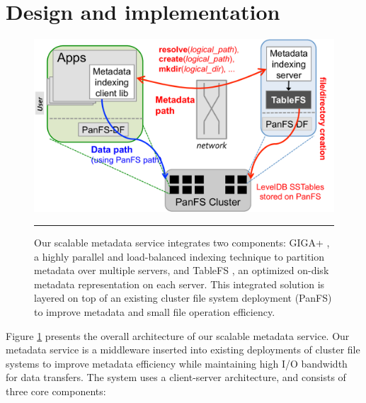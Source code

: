 \section{Design and implementation}

\begin{figure}[t]   %
\centerline{\includegraphics[scale=0.4]{./figs/giga-impl-leveldb-clusterfs}}
\vspace{10pt}
\caption{\textsf{\footnotesize
Our scalable metadata service integrates two components: GIGA+ \cite{GIGA11},
a highly parallel and load-balanced indexing technique 
to partition metadata over multiple servers, and TableFS \cite{TableFS},
an optimized on-disk metadata representation on each server.
This integrated solution is layered on top of an existing cluster
file system deployment (PanFS) to improve metadata
and small file operation efficiency.
}}
\hrule
\label{fig:design}
\end{figure}       %

Figure \ref{fig:design} presents the overall architecture of our scalable
metadata service. Our metadata service is a middleware inserted into
existing deployments of cluster file systems to improve metadata efficiency
while maintaining high I/O bandwidth for data transfers.
The system uses a client-server architecture,
and consists of three core components:

